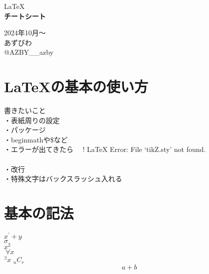 \documentclass[11pt,a4j]{jreport}
\begin{document}

\thispagestyle{empty}
\begin{center}

\vspace{20mm}
{\Large\noindent \LaTeX}\\
\vspace{40mm}
{\huge\noindent\textbf{チートシート}}\\
\medskip
\vspace{\baselineskip}
\vspace{30mm}

{\Large\noindent
2024年10月〜\\
\vspace{\baselineskip}
あずびわ\\
@AZBY__azby\\
}
\vspace{40mm}

\end{center}

\thispagestyle{empty}
\clearpage


\tableofcontents
\thispagestyle{fancy}
\pagestyle{fancy}
\lhead{\rightmark}
\renewcommand{\chaptermark}[1]{\markboth{第\ \normalfont\thechapter\ 章~~#1}{}}
\thispagestyle{fancy}
\chapter{LaTeXの基本の使い方}
書きたいこと\\
・表紙周りの設定\\
・パッケージ\\
・beginmathや\$など\\
・エラーが出てきたら　
! LaTeX Error: File `tikZ.sty' not found.\\
\\
・改行\\
・特殊文字はバックスラッシュ入れる\\

\chapter{基本の記法}
\thispagestyle{fancy}
$x^{\prime}+y$\\
$\sigma$\\
$x^{2}$\\
${}~{\forall}x$\\
${}^{\exists}x$
${}_{n}C_{r}$\\
\begin{equation}
a+b
\end{equation}
\end{document}
